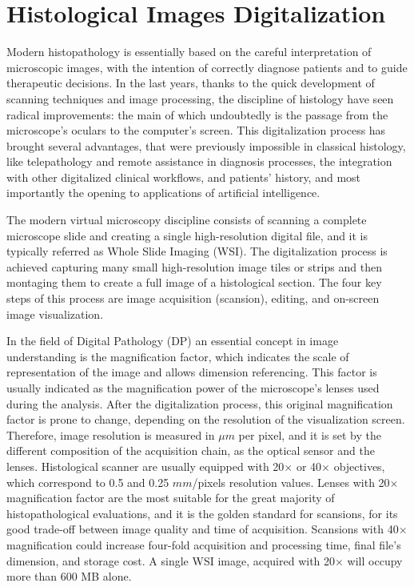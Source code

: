 \section{Histological Images Digitalization} \label{ssec:hist_im}
    Modern histopathology is essentially based on the careful interpretation of microscopic images, with the intention of correctly diagnose patients and to guide therapeutic decisions. In the last years, thanks to the quick development of scanning techniques and image processing, the discipline of histology have seen radical improvements: the main of which undoubtedly is the passage from the microscope's oculars to the computer's screen. This digitalization process has brought several advantages, that were previously impossible in classical histology, like telepathology and remote assistance in diagnosis processes, the integration with other digitalized clinical workflows, and patients' history, and most importantly the opening to applications of artificial intelligence.

    The modern virtual microscopy discipline consists of scanning a complete microscope slide and creating a single high-resolution digital file, and it is typically referred as Whole Slide Imaging (WSI). The digitalization process is achieved capturing many small high-resolution image tiles or strips and then montaging them to create a full image of a histological section. The four key steps of this process are image acquisition (scansion), editing, and on-screen image visualization.

    In the field of Digital Pathology (DP) an essential concept in image understanding is the magnification factor, which indicates the scale of representation of the image and allows dimension referencing. This factor is usually indicated as the magnification power of the microscope's lenses used during the analysis. After the digitalization process, this original magnification factor is prone to change, depending on the resolution of the visualization screen. Therefore, image resolution is measured in $\mu m$ per pixel, and it is set by the different composition of the acquisition chain, as the optical sensor and the lenses. Histological scanner are usually equipped with 20$\times$ or 40$\times$ objectives, which correspond to 0.5 and 0.25 $mm$/pixels resolution values. Lenses with 20$\times$ magnification factor are the most suitable for the great majority of histopathological evaluations, and it is the golden standard for scansions, for its good trade-off between image quality and time of acquisition. Scansions with 40$\times$ magnification could increase four-fold acquisition and processing time, final file's dimension, and storage cost. A single WSI image, acquired with 20$\times$ will occupy more than 600 MB alone.

